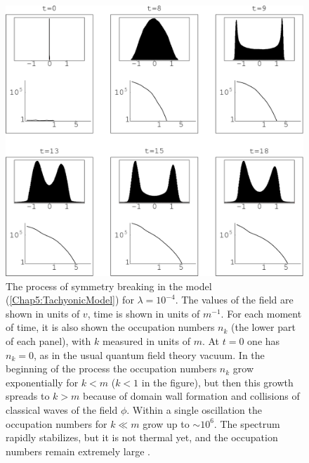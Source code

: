\documentclass[11pt,a4paper,twoside]{book}
\begin{document}
\begin{figure}[h]
	\centering
	\includegraphics[width=0.7\linewidth, height=0.35\textheight]{Images/Chap5/TachyonicInstability_Fig3}
	\caption{The process of symmetry breaking in the model (\ref{Chap5:TachyonicModel}) for $\lambda = 10^{-4}$. The values of the field are shown in units of $ v $, time is shown in units of $ m^{-1} $. For each moment of time, it is also shown the occupation numbers $ n_{k} $ (the lower part of each panel), with $ k $ measured in units of $ m $. At $ t=0 $ one has $ n_{k}=0 $, as in the usual quantum field theory vacuum. In the beginning of the process the occupation numbers $ n_{k} $ grow exponentially for $ k < m $ ($ k < 1 $ in the figure), but then this growth spreads to $ k>m $ because of domain wall formation and collisions of classical waves of the field $\phi$. Within a single oscillation the occupation numbers for $ k\ll m $ grow up to $\sim 10^{6}$.  The spectrum rapidly stabilizes, but it is not thermal yet, and the occupation numbers remain extremely large \cite{Chap5:TachyonicInstability}.}
	\label{fig:tachyonicinstabilityfig3}
\end{figure}
\end{document}
